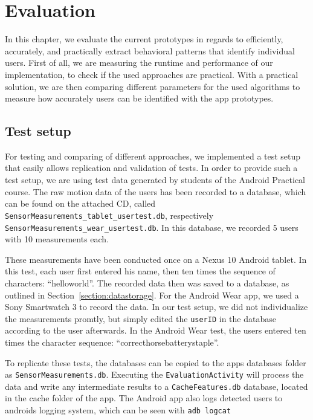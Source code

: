 \chapter{Evaluation}\label{chapter:evaluation}
In this chapter, we evaluate the current prototypes in regards to efficiently, accurately, and practically extract behavioral patterns that identify individual users. First of all, we are measuring the runtime and performance of our implementation, to check if the used approaches are practical. With a practical solution, we are then comparing different parameters for the used algorithms to measure how accurately users can be identified with the app prototypes.

\section{Test setup}
For testing and comparing of different approaches, we implemented a test setup that easily allows replication and validation of tests. In order to provide such a test setup, we are using test data generated by students of the Android Practical course. The raw motion data of the users has been recorded to a database, which can be found on the attached CD, called \lstinline$SensorMeasurements_tablet_usertest.db$, respectively \lstinline$SensorMeasurements_wear_usertest.db$. In this database, we recorded 5 users with 10 measurements each.

These measurements have been conducted once on a Nexus 10 Android tablet. In this test, each user first entered his name, then ten times the sequence of characters: ``helloworld''. The recorded data then was saved to a database, as outlined in Section~\ref{section:datastorage}. For the Android Wear app, we used a Sony Smartwatch 3 to record the data. In our test setup, we did not individualize the measurements promtly, but simply edited the \lstinline$userID$ in the database according to the user afterwards. In the Android Wear test, the users entered ten times the character sequence: ``correcthorsebatterystaple''.

To replicate these tests, the databases can be copied to the apps databases folder as \lstinline$SensorMeasurements.db$. Executing the \lstinline$EvaluationActivity$ will process the data and write any intermediate results to a \lstinline$CacheFeatures.db$ database, located in the cache folder of the app. The Android app also logs detected users to androids logging system, which can be seen with \lstinline$adb logcat$

